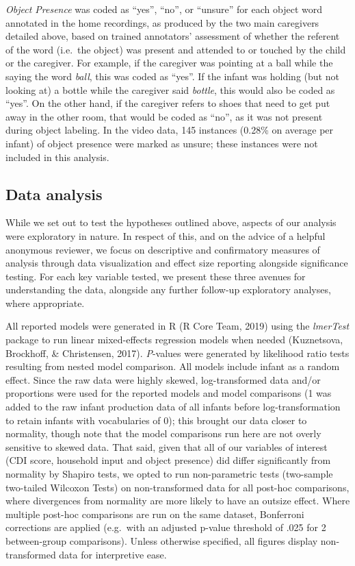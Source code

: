 \documentclass[
  man,mask,floatsintext]{apa6}
\begin{document}
\emph{Object Presence} was coded as ``yes'', ``no'', or ``unsure'' for each object word annotated in the home recordings, as produced by the two main caregivers detailed above, based on trained annotators' assessment of whether the referent of the word (i.e.~the object) was present and attended to or touched by the child or the caregiver. For example, if the caregiver was pointing at a ball while the saying the word \emph{ball}, this was coded as ``yes''. If the infant was holding (but not looking at) a bottle while the caregiver said \emph{bottle}, this would also be coded as ``yes''. On the other hand, if the caregiver refers to shoes that need to get put away in the other room, that would be coded as ``no'', as it was not present during object labeling. In the video data, 145 instances (0.28\% on average per infant) of object presence were marked as unsure; these instances were not included in this analysis.

\hypertarget{data-analysis}{%
\subsection{Data analysis}\label{data-analysis}}

While we set out to test the hypotheses outlined above, aspects of our analysis were exploratory in nature. In respect of this, and on the advice of a helpful anonymous reviewer, we focus on descriptive and confirmatory measures of analysis through data visualization and effect size reporting alongside significance testing. For each key variable tested, we present these three avenues for understanding the data, alongside any further follow-up exploratory analyses, where appropriate.

All reported models were generated in R (R Core Team, 2019) using the \emph{lmerTest} package to run linear mixed-effects regression models when needed (Kuznetsova, Brockhoff, \& Christensen, 2017). \emph{P}-values were generated by likelihood ratio tests resulting from nested model comparison. All models include infant as a random effect. Since the raw data were highly skewed, log-transformed data and/or proportions were used for the reported models and model comparisons (1 was added to the raw infant production data of all infants before log-transformation to retain infants with vocabularies of 0); this brought our data closer to normality, though note that the model comparisons run here are not overly sensitive to skewed data. That said, given that all of our variables of interest (CDI score, household input and object presence) did differ significantly from normality by Shapiro tests, we opted to run non-parametric tests (two-sample two-tailed Wilcoxon Tests) on non-transformed data for all post-hoc comparisons, where divergences from normality are more likely to have an outsize effect. Where multiple post-hoc comparisons are run on the same dataset, Bonferroni corrections are applied (e.g.~with an adjusted p-value threshold of .025 for 2 between-group comparisons). Unless otherwise specified, all figures display non-transformed data for interpretive ease.
\end{document}
